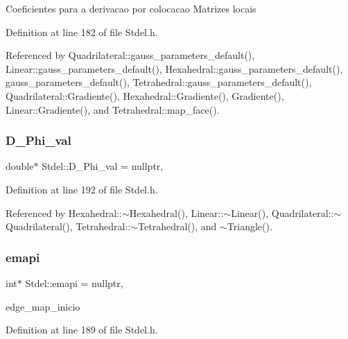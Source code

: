 Coeficientes para a derivacao por colocacao Matrizes locais 

Definition at line 182 of file Stdel.\+h.



Referenced by Quadrilateral\+::gauss\+\_\+parameters\+\_\+default(), Linear\+::gauss\+\_\+parameters\+\_\+default(), Hexahedral\+::gauss\+\_\+parameters\+\_\+default(), gauss\+\_\+parameters\+\_\+default(), Tetrahedral\+::gauss\+\_\+parameters\+\_\+default(), Quadrilateral\+::\+Gradiente(), Hexahedral\+::\+Gradiente(), Gradiente(), Linear\+::\+Gradiente(), and Tetrahedral\+::map\+\_\+face().

\mbox{\label{classStdel_a80a6c89c61bfef1160257e97b3ffb0a2}} 
\subsubsection{\texorpdfstring{D\+\_\+\+Phi\+\_\+val}{D\_Phi\_val}}
{\footnotesize\ttfamily double$\ast$ Stdel\+::\+D\+\_\+\+Phi\+\_\+val = nullptr\hspace{0.3cm}{\ttfamily [protected]}, {\ttfamily [inherited]}}



Definition at line 192 of file Stdel.\+h.



Referenced by Hexahedral\+::$\sim$\+Hexahedral(), Linear\+::$\sim$\+Linear(), Quadrilateral\+::$\sim$\+Quadrilateral(), Tetrahedral\+::$\sim$\+Tetrahedral(), and $\sim$\+Triangle().

\mbox{\label{classStdel_a9ba8eb743aeb36984b7c4ececa837e16}} 
\subsubsection{\texorpdfstring{emapi}{emapi}}
{\footnotesize\ttfamily int$\ast$ Stdel\+::emapi = nullptr\hspace{0.3cm}{\ttfamily [protected]}, {\ttfamily [inherited]}}



edge\+\_\+map\+\_\+inicio 



Definition at line 189 of file Stdel.\+h.



